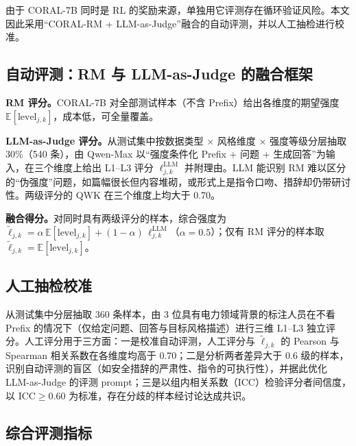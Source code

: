 \documentclass[fontset=fandol,type=master,campus=shenzhen,etitleauto=true]{hithesisbook}
\begin{document}
由于 CORAL-7B 同时是 RL 的奖励来源，单独用它评测存在循环验证风险。本文因此采用“CORAL-RM + LLM-as-Judge”融合的自动评测，并以人工抽检进行校准。

\subsection{自动评测：RM 与 LLM-as-Judge 的融合框架}\label{ux81eaux52a8ux8bc4ux6d4b}

\textbf{RM 评分。}CORAL-7B 对全部测试样本（不含 Prefix）给出各维度的期望强度 $\mathbb{E}[\text{level}_{j,k}]$，成本低，可全量覆盖。

\textbf{LLM-as-Judge 评分。}从测试集中按数据类型 × 风格维度 × 强度等级分层抽取 30\%（540 条），由 Qwen-Max 以“强度条件化 Prefix + 问题 + 生成回答”为输入，在三个维度上给出 L1--L3 评分 $\ell^{\text{LLM}}_{j,k}$ 并附理由。LLM 能识别 RM 难以区分的“伪强度”问题，如篇幅很长但内容堆砌，或形式上是指令口吻、措辞却仍带研讨性。两级评分的 QWK 在三个维度上均大于 0.70。

\textbf{融合得分。}对同时具有两级评分的样本，综合强度为 $\tilde{\ell}_{j,k} = \alpha\, \mathbb{E}[\text{level}_{j,k}] + (1-\alpha)\, \ell^{\text{LLM}}_{j,k}$（$\alpha = 0.5$）；仅有 RM 评分的样本取 $\tilde{\ell}_{j,k} = \mathbb{E}[\text{level}_{j,k}]$。

\subsection{人工抽检校准}\label{ux4ebaux5de5ux62bdux68c0ux6821ux51c6}

从测试集中分层抽取 360 条样本，由 3 位具有电力领域背景的标注人员在不看 Prefix 的情况下（仅给定问题、回答与目标风格描述）进行三维 L1--L3 独立评分。人工评分用于三方面：一是校准自动评测，人工评分与 $\tilde{\ell}_{j,k}$ 的 Pearson 与 Spearman 相关系数在各维度均高于 0.70；二是分析两者差异大于 0.6 级的样本，识别自动评测的盲区（如安全措辞的严肃性、指令的可执行性），并据此优化 LLM-as-Judge 的评测 prompt；三是以组内相关系数（ICC）\cite{ref76}检验评分者间信度，以 $\text{ICC} \ge 0.60$ 为标准，存在分歧的样本经讨论达成共识。

\subsection{综合评测指标}\label{ux7efcux5408ux8bc4ux6d4bux6307ux6807}
\end{document}
